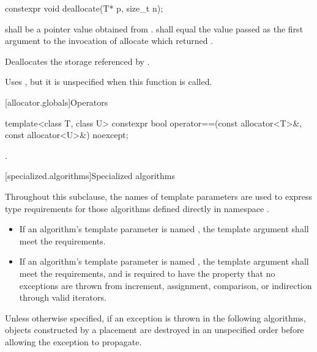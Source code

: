 %
\begin{itemdecl}
constexpr void deallocate(T* p, size_t n);
\end{itemdecl}

\begin{itemdescr}
\pnum
\requires
{} shall be a pointer value obtained from .
 shall equal the value passed as the first argument
to the invocation of allocate which returned .

\pnum
\effects
Deallocates the storage referenced by  .

\pnum
\remarks
Uses
,
but it is unspecified
when this function is called.
\end{itemdescr}

[allocator.globals]{Operators}

%
\begin{itemdecl}
template<class T, class U>
  constexpr bool operator==(const allocator<T>&, const allocator<U>&) noexcept;
\end{itemdecl}

\begin{itemdescr}
\pnum
\returns
{}.
\end{itemdescr}

[specialized.algorithms]{Specialized algorithms}

\pnum
Throughout this subclause,
the names of template parameters are used to express type requirements
for those algorithms defined directly in namespace .
\begin{itemize}
\item
If an algorithm's template parameter is named ,
the template argument shall meet the
 requirements.
\item
If an algorithm's template parameter is named ,
the template argument shall meet the
 requirements, and
is required to have the property that no exceptions are thrown
from increment, assignment, comparison, or indirection through valid iterators.
\end{itemize}

\pnum
Unless otherwise specified,
if an exception is thrown in the following algorithms,
objects constructed by a placement 
are destroyed in an unspecified order
before allowing the exception to propagate.

